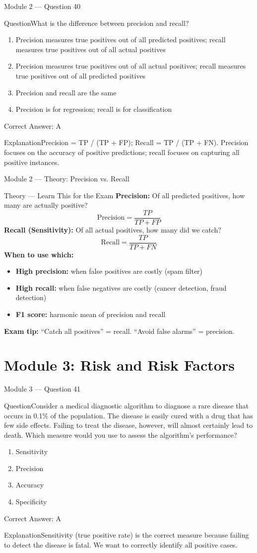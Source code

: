 \documentclass[aspectratio=169,10pt]{beamer}
\newcommand{\question}[1]{\begin{block}{Question}#1\end{block}}
\newcommand{\options}[4]{%
	\begin{enumerate}[label=\Alph*.,leftmargin=*]
		\item #1
		\item #2
		\item #3
		\item #4
	\end{enumerate}
}
\newcommand{\answerbox}[1]{\begin{exampleblock}{Correct Answer: #1}\end{exampleblock}}
\newcommand{\explain}[1]{\begin{block}{Explanation}#1\end{block}}
\newcommand{\theory}[1]{%
	\begin{block}{Theory --- Learn This for the Exam}
		\small #1
	\end{block}
}
\begin{document}
	\begin{frame}{Module 2 --- Question 40}
		\question{What is the difference between precision and recall?}
		\options{Precision measures true positives out of all predicted positives; recall measures true positives out of all actual positives}{Precision measures true positives out of all actual positives; recall measures true positives out of all predicted positives}{Precision and recall are the same}{Precision is for regression; recall is for classification}
		\answerbox{A}
		\explain{Precision = TP / (TP + FP); Recall = TP / (TP + FN). Precision focuses on the accuracy of positive predictions; recall focuses on capturing all positive instances.}
	\end{frame}
	
	\begin{frame}{Module 2 --- Theory: Precision vs. Recall}
		\theory{
			\textbf{Precision:} Of all predicted positives, how many are actually positive?
			\[
			\text{Precision} = \frac{TP}{TP + FP}
			\]
			\textbf{Recall (Sensitivity):} Of all actual positives, how many did we catch?
			\[
			\text{Recall} = \frac{TP}{TP + FN}
			\]
			\textbf{When to use which:}
			\begin{itemize}
				\item \textbf{High precision:} when false positives are costly (spam filter)
				\item \textbf{High recall:} when false negatives are costly (cancer detection, fraud detection)
				\item \textbf{F1 score:} harmonic mean of precision and recall
			\end{itemize}
			\textbf{Exam tip:} ``Catch all positives'' = recall. ``Avoid false alarms'' = precision.
		}
	\end{frame}
	
	\section{Module 3: Risk and Risk Factors}
	
	\begin{frame}{Module 3 --- Question 41}
		\question{Consider a medical diagnostic algorithm to diagnose a rare disease that occurs in 0.1\% of the population. The disease is easily cured with a drug that has few side effects. Failing to treat the disease, however, will almost certainly lead to death. Which measure would you use to assess the algorithm's performance?}
		\options{Sensitivity}{Precision}{Accuracy}{Specificity}
		\answerbox{A}
		\explain{Sensitivity (true positive rate) is the correct measure because failing to detect the disease is fatal. We want to correctly identify all positive cases.}
	\end{frame}
	
\end{document}
